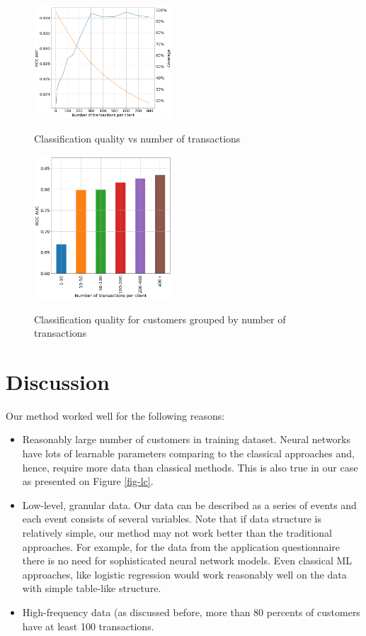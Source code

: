\documentclass[sigconf]{acmart}
\begin{document}
\begin{figure}[ht]
  \caption{Classification quality vs number of transactions}
  \includegraphics[width=0.46\textwidth]{figures/information-vs-accuracy-max.png}
  \label{fig-tc}
\end{figure}

\begin{figure}[ht]
  \caption{Classification quality for customers grouped by number of transactions}
  \includegraphics[width=0.46\textwidth]{figures/information-vs-accuracy-bins.png}
  \label{fig-tcb}
\end{figure}
\section{Discussion}

Our method worked well for the following reasons:
\begin{itemize}
    \item Reasonably large number of customers in training dataset. Neural networks have lots of learnable parameters comparing to the classical approaches and, hence, require more data than classical methods. This is also true in our case as presented on Figure \ref{fig-lc}.
    \item Low-level, granular data. Our data can be described as a series of events and each event consists of several variables. Note that if data structure is relatively simple, our method may not work better than the traditional approaches. For example, for the data from the application questionnaire there is no need for sophisticated neural network models. Even classical ML approaches, like logistic regression would work reasonably well on the data with simple table-like structure.
    \item High-frequency data (as discussed before, more than 80 percents of customers have at least 100 transactions.
\end{itemize}
\end{document}
